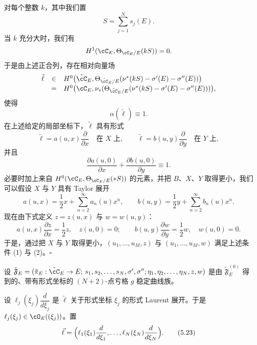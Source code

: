 
对每个整数 $k$，其中我们置
\[
S=\sum_{j=1}^N s_j(E).
\]
当 $k$ 充分大时，我们有
\[
H^1(\cC_E,\Theta_{\cC_E/E}(kS))=0.
\]
于是由上述正合列，存在相对向量场
\[
\begin{array}{rcl}
\tilde\ell & \in & H^0\bigl(\tilde{\cC}_E,\Theta_{\tilde{\cC}_E/E}(\nu^*(kS)-\sigma'(E)-\sigma''(E))\bigr)\\[2pt]
& = & H^0\bigl(\cC_E,\nu_*(\Theta_{\tilde{\cC}_E/E}(\nu^*(kS)-\sigma'(E)-\sigma''(E)))\bigr),
\end{array}
\]
使得
\[
\alpha(\tilde\ell)\equiv 1.
\]
在上述给定的局部坐标下，$\tilde\ell$ 具有形式
\[
\tilde\ell=a(u,x)\frac{\partial}{\partial x}\quad\text{在 }X\text{ 上},\qquad
\tilde\ell=b(u,y)\frac{\partial}{\partial y}\quad\text{在 }Y\text{ 上},
\]
并且
\[
\frac{\partial a(u,0)}{\partial x}+\frac{\partial b(u,0)}{\partial y}\equiv 1.
\]
必要时加上来自 $H^0(\cC_E,\Theta_{\cC_E/E}(*S))$ 的元素，并把 $B$、$X$、$Y$ 取得更小，我们可以假设 $X$ 与 $Y$ 具有 Taylor 展开
\[
a(u,x)=\frac12 x+\sum_{n=2}^{\infty}a_n(u)x^n,\qquad
b(u,y)=\frac12 y+\sum_{n=2}^{\infty}b_n(u)x^n.
\]
现在由下式定义 $z=z(u,x)$ 与 $w=w(u,y)$：
\[
a(u,x)\frac{\partial z}{\partial x}=\frac12 z,\quad z(u,0)=0;\qquad
b(u,y)\frac{\partial w}{\partial y}=\frac12 w,\quad w(u,0)=0.
\]
于是，通过把 $X$ 与 $Y$ 取得更小，$(u_1,\dots,u_M,z)$ 与 $(u_1,\dots,u_M,w)$ 满足上述条件 (1) 与 (2)。\hfill$\square$



设 $\tilde{\mathfrak{F}}_E=(\tilde\pi_E:\tilde{\cC}_E\to E;\,s_1,s_2,\dots,s_N,\sigma',\sigma'';\eta_1,\eta_2,\dots,\eta_N,z,w)$ 是由 $\tilde{\mathfrak{F}}^{(0)}_E$ 得到的、带有形式坐标的 $(N+2)$-点亏格 $g$ 稳定曲线族。

设 $\ell_j(\xi_j)\dfrac{d}{d\xi_j}$ 是 $\tilde\ell$ 关于形式坐标 $\xi_j$ 的形式 Laurent 展开。于是 $\ell_j(\xi_j)\in\cO_E((\xi_j))$。置
\begin{equation}
\vec\ell=\Bigl(\ell_1(\xi_1)\frac{d}{d\xi_1},\dots,\ell_N(\xi_N)\frac{d}{d\xi_N}\Bigr). \tag{5.23}
\end{equation}

